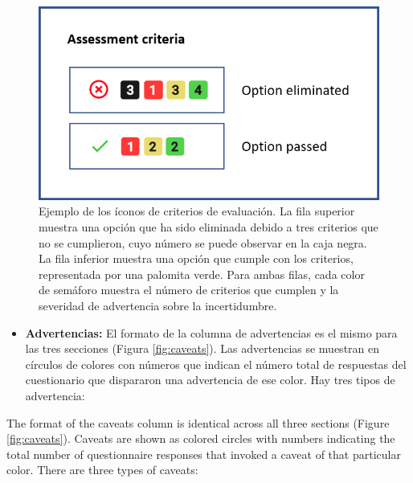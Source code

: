 \documentclass[
  11pt,
]{book}
\providecommand{\tightlist}{%
  \setlength{\itemsep}{0pt}\setlength{\parskip}{0pt}}
\begin{document}
\begin{figure}

{\centering \includegraphics[width=0.35\linewidth]{images/a-criteria} 

}

\caption{Ejemplo de los íconos de criterios de evaluación. La fila superior muestra una opción que ha sido eliminada debido a tres criterios que no se cumplieron, cuyo número se puede observar en la caja negra. La fila inferior muestra una opción que cumple con los criterios, representada por una palomita verde. Para ambas filas, cada color de semáforo muestra el número de criterios que cumplen y la severidad de advertencia sobre la incertidumbre.}\label{fig:a-criteria}
\end{figure}

\begin{itemize}
\tightlist
\item
  \textbf{Advertencias:} El formato de la columna de advertencias es el mismo para las tres secciones (Figura \ref{fig:caveats}). Las advertencias se muestran en círculos de colores con números que indican el número total de respuestas del cuestionario que dispararon una advertencia de ese color. Hay tres tipos de advertencia:
\end{itemize}

The format of the caveats column is identical across all three sections (Figure \ref{fig:caveats}). Caveats are shown as colored circles with numbers indicating the total number of questionnaire responses that invoked a caveat of that particular color. There are three types of caveats:
\end{document}
